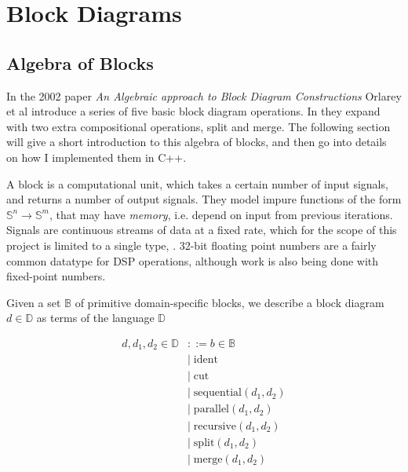 \chapter{Block Diagrams}

\newcommand{\Ident}{\ensuremath{\textrm{ident}}}
\newcommand{\Cut}{\ensuremath{\textrm{cut}}}
\newcommand{\Sequential}{\ensuremath{\textrm{sequential}}}
\newcommand{\Parallel}{\ensuremath{\textrm{parallel}}}
\newcommand{\Recursive}{\ensuremath{\textrm{recursive}}}
\newcommand{\Split}{\ensuremath{\textrm{split}}}
\newcommand{\Merge}{\ensuremath{\textrm{merge}}}
\newcommand{\Ins}{\ensuremath{\textbf{ins}}}
\newcommand{\Outs}{\ensuremath{\textbf{outs}}}
\newcommand{\Sig}{\ensuremath{\mathbb{S}}}


\section{Algebra of Blocks}

In the 2002 paper \emph{An Algebraic approach to Block Diagram Constructions}\autocite{orlarey2002} Orlarey et al introduce a series of five
basic block diagram operations. In \autocite{orlarey2004} they expand with two extra compositional
operations, split and merge. The following section will give a short introduction to this algebra of blocks,
and then go into details on how I implemented them in C++.

A block is a computational unit, which takes a certain number of input signals, and returns a number of
output signals. They model impure functions of the form $\mathbb{S}^n\rightarrow \mathbb{S}^m$, that may have
\emph{memory}, i.e. depend on input from previous iterations. Signals are continuous streams of
data at a fixed rate, which for the scope of this project is limited to a single type,
. 32-bit floating point numbers are a fairly common datatype for DSP operations,
although work is also being done with fixed-point numbers.

Given a set $\mathbb{B}$ of primitive domain-specific blocks, we describe a block diagram
$d \in \mathbb{D}$ as terms of the language $\mathbb{D}$

\begin{align*}
  d, d_1, d_2 \in \mathbb{D} & ::= b \in \mathbb{B}      \\
                             & |\; \Ident                \\
                             & |\; \Cut                  \\
                             & |\; \Sequential(d_1, d_2) \\
                             & |\; \Parallel(d_1, d_2)   \\
                             & |\; \Recursive(d_1, d_2)  \\
                             & |\; \Split(d_1, d_2)      \\
                             & |\; \Merge(d_1, d_2)      \\
\end{align*}

